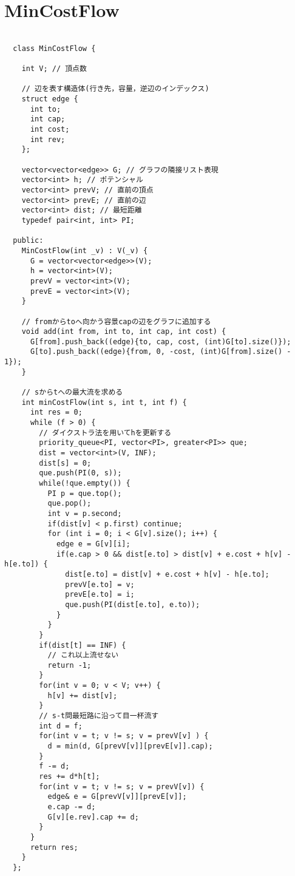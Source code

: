 \documentclass{jsarticle}
\begin{document}
\section{MinCostFlow}
\color{black}
\begin{lstlisting}[caption=MinCostFlow]

  class MinCostFlow {
  
    int V; // 頂点数
  
    // 辺を表す構造体(行き先，容量，逆辺のインデックス)
    struct edge {
      int to;
      int cap;
      int cost;
      int rev;
    };
  
    vector<vector<edge>> G; // グラフの隣接リスト表現
    vector<int> h; // ポテンシャル
    vector<int> prevV; // 直前の頂点
    vector<int> prevE; // 直前の辺
    vector<int> dist; // 最短距離
    typedef pair<int, int> PI;
  
  public:
    MinCostFlow(int _v) : V(_v) {
      G = vector<vector<edge>>(V);
      h = vector<int>(V);
      prevV = vector<int>(V);
      prevE = vector<int>(V);
    }
  
    // fromからtoへ向かう容景capの辺をグラフに追加する
    void add(int from, int to, int cap, int cost) {
      G[from].push_back((edge){to, cap, cost, (int)G[to].size()});
      G[to].push_back((edge){from, 0, -cost, (int)G[from].size() - 1});
    }
  
    // sからtへの最大流を求める
    int minCostFlow(int s, int t, int f) {
      int res = 0;
      while (f > 0) {
        // ダイクストラ法を用いてhを更新する
        priority_queue<PI, vector<PI>, greater<PI>> que;
        dist = vector<int>(V, INF);
        dist[s] = 0;
        que.push(PI(0, s));
        while(!que.empty()) {
          PI p = que.top();
          que.pop();
          int v = p.second;
          if(dist[v] < p.first) continue;
          for (int i = 0; i < G[v].size(); i++) {
            edge e = G[v][i];
            if(e.cap > 0 && dist[e.to] > dist[v] + e.cost + h[v] - h[e.to]) {
              dist[e.to] = dist[v] + e.cost + h[v] - h[e.to];
              prevV[e.to] = v;
              prevE[e.to] = i;
              que.push(PI(dist[e.to], e.to));
            }
          }
        }
        if(dist[t] == INF) {
          // これ以上流せない
          return -1;
        }
        for(int v = 0; v < V; v++) {
          h[v] += dist[v];
        }
        // s-t問最短路に沿って目一杯流す
        int d = f;
        for(int v = t; v != s; v = prevV[v] ) {
          d = min(d, G[prevV[v]][prevE[v]].cap);
        }
        f -= d;
        res += d*h[t];
        for(int v = t; v != s; v = prevV[v]) {
          edge& e = G[prevV[v]][prevE[v]];
          e.cap -= d;
          G[v][e.rev].cap += d;
        }
      }
      return res;
    }
  };
  

\end{lstlisting}
\end{document}
